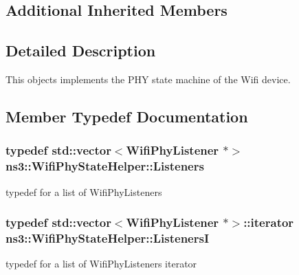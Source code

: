 \subsection*{Additional Inherited Members}


\subsection{Detailed Description}
This objects implements the P\+HY state machine of the Wifi device. 

\subsection{Member Typedef Documentation}
\subsubsection[{\texorpdfstring{Listeners}{Listeners}}]{\setlength{\rightskip}{0pt plus 5cm}typedef std\+::vector$<${\bf Wifi\+Phy\+Listener} $\ast$$>$ {\bf ns3\+::\+Wifi\+Phy\+State\+Helper\+::\+Listeners}\hspace{0.3cm}{\ttfamily [private]}}\hypertarget{classns3_1_1WifiPhyStateHelper_a76aeb492718646f940e216a63ff167f1}{}\label{classns3_1_1WifiPhyStateHelper_a76aeb492718646f940e216a63ff167f1}
typedef for a list of Wifi\+Phy\+Listeners 
\subsubsection[{\texorpdfstring{ListenersI}{ListenersI}}]{\setlength{\rightskip}{0pt plus 5cm}typedef std\+::vector$<${\bf Wifi\+Phy\+Listener} $\ast$$>$\+::iterator {\bf ns3\+::\+Wifi\+Phy\+State\+Helper\+::\+ListenersI}\hspace{0.3cm}{\ttfamily [private]}}\hypertarget{classns3_1_1WifiPhyStateHelper_a19700506a92d22ccbb6c18cf7f3c0520}{}\label{classns3_1_1WifiPhyStateHelper_a19700506a92d22ccbb6c18cf7f3c0520}
typedef for a list of Wifi\+Phy\+Listeners iterator 

